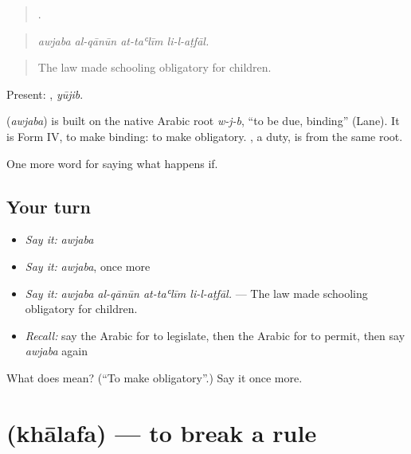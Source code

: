 \begin{quote}
   .
\end{quote}

\begin{quote}
\emph{awjaba al-qānūn at-taʿlīm li-l-aṭfāl.}
\end{quote}

\begin{quote}
The law made schooling obligatory for children.
\end{quote}

Present: , \emph{yūjib}.

\begin{cousinweb}
\textbf{} (\emph{awjaba}) is built on the native Arabic root \emph{w-j-b}, \textquotedblleft{}to be due, binding\textquotedblright{} (Lane). It is Form IV, to make binding: to make obligatory. , a duty, is from the same root.
\end{cousinweb}

\begin{grammarlens}[title={What you've built}]
One more word for saying what happens if.
\end{grammarlens}

\subsection*{Your turn}
\begin{itemize}
\raggedright
  \item \emph{Say it:} \emph{awjaba}
  \item \emph{Say it:} \emph{awjaba}, once more
  \item \emph{Say it:} \emph{awjaba al-qānūn at-taʿlīm li-l-aṭfāl.} — The law made schooling obligatory for children.
  \item \emph{Recall:} say the Arabic for to legislate, then the Arabic for to permit, then say \emph{awjaba} again
\end{itemize}

\begin{tcolorbox}[breakable,colback=teal!4,colframe=teal!35!black,title={Before you move on}]
What does  mean? (\textquotedblleft{}To make obligatory\textquotedblright{}.) Say it once more.
\end{tcolorbox}
\section[\texorpdfstring{\ar{خالف} (khālafa)}{خالف (khālafa)}]{ (khālafa) — to break a rule}

